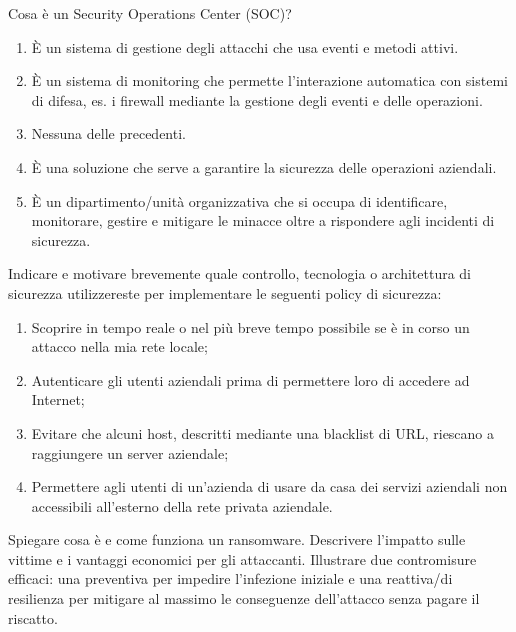 \documentclass[11pt,a4paper]{article}
\begin{document}
\begin{questionbox}
Cosa \`e un Security Operations Center (SOC)?
\begin{enumerate}[label=\alph*.]
    \item \`E un sistema di gestione degli attacchi che usa eventi e metodi attivi.
    \item \`E un sistema di monitoring che permette l'interazione automatica con sistemi di difesa, es. i firewall mediante la gestione degli eventi e delle operazioni.
    \item Nessuna delle precedenti.
    \item \`E una soluzione che serve a garantire la sicurezza delle operazioni aziendali.
    \item \`E un dipartimento/unit\`a organizzativa che si occupa di identificare, monitorare, gestire e mitigare le minacce oltre a rispondere agli incidenti di sicurezza.
\end{enumerate}
\end{questionbox}

\begin{questionbox}
Indicare e motivare brevemente quale controllo, tecnologia o architettura di sicurezza utilizzereste per implementare le seguenti policy di sicurezza:
\begin{enumerate}
    \item Scoprire in tempo reale o nel pi\`u breve tempo possibile se \`e in corso un attacco nella mia rete locale;
    \item Autenticare gli utenti aziendali prima di permettere loro di accedere ad Internet;
    \item Evitare che alcuni host, descritti mediante una blacklist di URL, riescano a raggiungere un server aziendale;
    \item Permettere agli utenti di un'azienda di usare da casa dei servizi aziendali non accessibili all'esterno della rete privata aziendale.
\end{enumerate}
\end{questionbox}

\begin{questionbox}
Spiegare cosa \`e e come funziona un ransomware. Descrivere l'impatto sulle vittime e i vantaggi economici per gli attaccanti. Illustrare due contromisure efficaci: una preventiva per impedire l'infezione iniziale e una reattiva/di resilienza per mitigare al massimo le conseguenze dell'attacco senza pagare il riscatto.
\end{questionbox}
\end{document}
